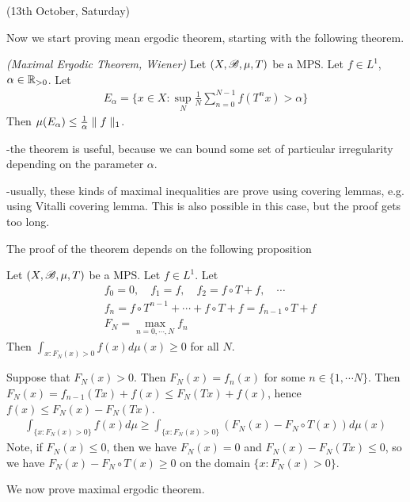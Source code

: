 \documentclass[10pt,a4paper]{report}
\newenvironment{proof}
{\begin{changemargin}{1cm}{0.5cm} 
	}%
	{\end{changemargin}
}
\begin{document}
\newday

(13th October, Saturday)
\s

Now we start proving mean ergodic theorem, starting with the following theorem.
\s

\thm \emph{(Maximal Ergodic Theorem, Wiener)} Let $(X,\mathscr{B}, \mu, T)$ be a MPS. Let $f\in L^1$, $\alpha\in \mathbb{R}_{>0}$. Let
\begin{align*}
E_{\alpha} = \{x\in X : \sup_N \frac{1}{N} \sum_{n=0}^{N-1} f(T^n x) > \alpha \}
\end{align*}
Then $\mu(E_{\alpha}) \leq \frac{1}{\alpha} \parallel f \parallel_{1}$.
\s

-the theorem is useful, because we can bound some set of particular irregularity depending on the parameter $\alpha$.

-usually, these kinds of maximal inequalities are prove using covering lemmas, e.g. using Vitalli covering lemma. This is also possible in this case, but the proof gets too long.
\s

The proof of the theorem depends on the following proposition
\s

\prop Let $(X,\mathscr{B}, \mu, T)$ be a MPS. Let $f\in L^1$. Let
\begin{align*}
&f_0 =0, \quad f_1=f, \quad f_2=f\circ T + f, \quad \cdots \\
&f_n = f\circ T^{n-1} + \cdots + f\circ T + f = f_{n-1}\circ T + f \\
&F_N = \max_{n=0,\cdots,N} f_n
\end{align*}
Then $\int_{x:F_N(x)>0} f(x)d\mu(x) \geq 0$ for all $N$.
\begin{proof}
\pf  Suppose that $F_N(x)>0$. Then $F_N(x) =f_n(x)$ for some $n \in \{1,\cdots N\}$. Then $F_N(x) = f_{n-1}(Tx) + f(x) \leq F_N(Tx) +f(x)$, hence $f(x) \leq F_N(x) -F_N(Tx)$.
\begin{align*}
\int_{\{x: F_N(x)>0\}} f(x) d\mu \geq \int_{\{x:F_N(x)>0\}} (F_N(x)-F_N\circ T(x) ) d\mu(x)
\end{align*}
Note, if $F_N(x)\leq 0$, then we have $F_N(x) = 0$ and $F_N(x) - F_N(Tx) \leq 0$, so we have $F_N(x) - F_N \circ T(x) \geq 0$ on the domain $\{x: F_N(x) >0 \}$. 

\eop
\end{proof}
\s

We now prove maximal ergodic theorem.
\end{document}
